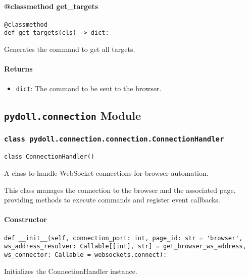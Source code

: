 \documentclass{article}
\begin{document}
\paragraph{@classmethod get\_targets}

\begin{lstlisting}[style=pythonstyle]
@classmethod
def get_targets(cls) -> dict:
\end{lstlisting}

\noindent Generates the command to get all targets.

\paragraph{Returns}

\begin{itemize}
    \item \lstinline[style=pythonstyle]|dict|: The command to be sent to the browser.
\end{itemize}

\hrulefill

\subsection*{\texttt{pydoll.connection} Module}

\subsubsection*{\texttt{class pydoll.connection.connection.ConnectionHandler}}
\noindent\texttt{class ConnectionHandler()}

\noindent A class to handle WebSocket connections for browser automation.

\noindent This class manages the connection to the browser and the associated page, providing methods to execute commands and register event callbacks.

\paragraph{Constructor}

\begin{lstlisting}[style=pythonstyle]
def __init__(self, connection_port: int, page_id: str = 'browser', ws_address_resolver: Callable[[int], str] = get_browser_ws_address, ws_connector: Callable = websockets.connect):
\end{lstlisting}

\noindent Initializes the ConnectionHandler instance.
\end{document}

